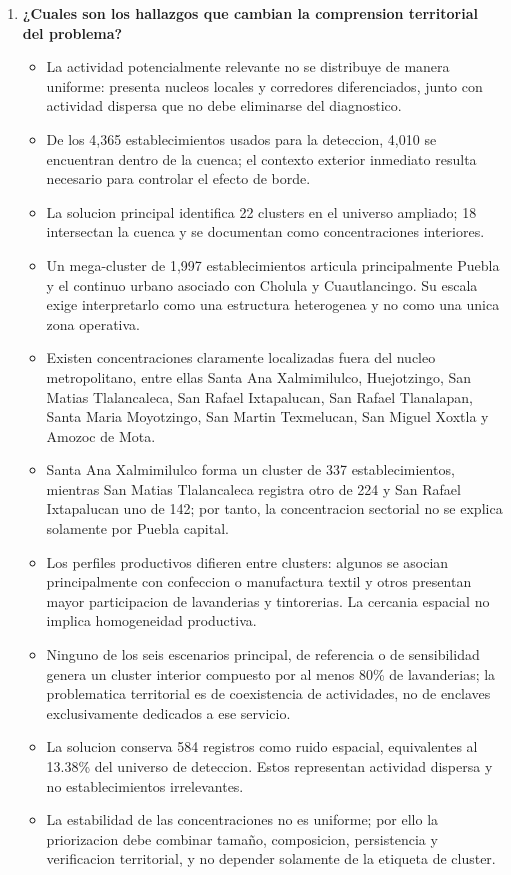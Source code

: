 \documentclass[11pt,letterpaper]{article}
\begin{document}
\begin{enumerate}
    \item \textbf{¿Cuales son los hallazgos que cambian la comprension territorial del problema?}
    \begin{itemize}
        \item La actividad potencialmente relevante no se distribuye de manera uniforme: presenta nucleos locales y corredores diferenciados, junto con actividad dispersa que no debe eliminarse del diagnostico.
        \item De los 4,365 establecimientos usados para la deteccion, 4,010 se encuentran dentro de la cuenca; el contexto exterior inmediato resulta necesario para controlar el efecto de borde.
        \item La solucion principal identifica 22 clusters en el universo ampliado; 18 intersectan la cuenca y se documentan como concentraciones interiores.
        \item Un mega-cluster de 1,997 establecimientos articula principalmente Puebla y el continuo urbano asociado con Cholula y Cuautlancingo. Su escala exige interpretarlo como una estructura heterogenea y no como una unica zona operativa.
        \item Existen concentraciones claramente localizadas fuera del nucleo metropolitano, entre ellas Santa Ana Xalmimilulco, Huejotzingo, San Matias Tlalancaleca, San Rafael Ixtapalucan, San Rafael Tlanalapan, Santa Maria Moyotzingo, San Martin Texmelucan, San Miguel Xoxtla y Amozoc de Mota.
        \item Santa Ana Xalmimilulco forma un cluster de 337 establecimientos, mientras San Matias Tlalancaleca registra otro de 224 y San Rafael Ixtapalucan uno de 142; por tanto, la concentracion sectorial no se explica solamente por Puebla capital.
        \item Los perfiles productivos difieren entre clusters: algunos se asocian principalmente con confeccion o manufactura textil y otros presentan mayor participacion de lavanderias y tintorerias. La cercania espacial no implica homogeneidad productiva.
        \item Ninguno de los seis escenarios principal, de referencia o de sensibilidad genera un cluster interior compuesto por al menos 80\% de lavanderias; la problematica territorial es de coexistencia de actividades, no de enclaves exclusivamente dedicados a ese servicio.
        \item La solucion conserva 584 registros como ruido espacial, equivalentes al 13.38\% del universo de deteccion. Estos representan actividad dispersa y no establecimientos irrelevantes.
        \item La estabilidad de las concentraciones no es uniforme; por ello la priorizacion debe combinar tamaño, composicion, persistencia y verificacion territorial, y no depender solamente de la etiqueta de cluster.
    \end{itemize}


\end{enumerate}
\end{document}
